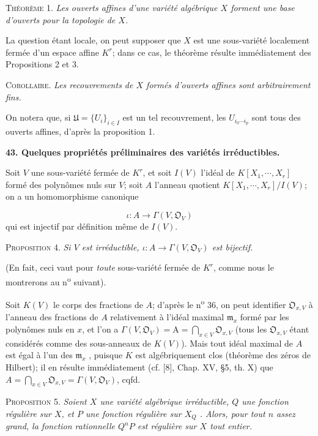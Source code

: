 \textsc{Théorème} 1. \textit{Les ouverts affines d'une variété algébrique $X$ forment une base d'ouverts pour la topologie de $X$.}

La question étant locale, on peut supposer que $X$ est une sous-variété localement fermée d'un espace affine $K^r$; dans ce cas, le théorème résulte immédiatement des Propositions 2 et 3.

\textsc{Corollaire}. \textit{Les recouvrements de $X$ formés d'ouverts affines sont arbitrairement fins.}

On notera que, si $\mathfrak{U} = \{U_i\}_{i \in I}$ est un tel recouvrement, les $U_{i_0 \cdots i_p}$ sont tous des ouverts affines, d'après la proposition 1.


\textbf{43. Quelques propriétés préliminaires des variétés irréductibles.}

Soit $V$ une
sous-variété fermée de $K^r$, et soit $I(V)$ l'idéal de $K[X_1 , \cdots , X_r]$ formé des polynômes nuls sur $V$; soit $A$ l'anneau quotient $K[X_1 , \cdots , X_r]/I(V)$; on a un homomorphisme canonique

\begin{equation*}
\iota : A \to \Gamma(V, \mathfrak{O}_V)
\end{equation*}
qui est injectif par définition même de $I(V)$.

\textsc{Proposition} 4. \textit{Si $V$ est irréductible, $\iota : A \to \Gamma(V, \mathfrak{O}_V)$ est bijectif.}

(En fait, ceci vaut pour \textit{toute} sous-variété fermée de $K^r$, comme nous le montrerons au n\textsuperscript{o} suivant).

Soit $K(V)$ le corps des fractions de $A$; d'après le n\textsuperscript{o} 36, on peut identifier $\mathfrak{O}_{x,V}$ à l'anneau des fractions de $A$ relativement à l'idéal maximal $\mathfrak{m}_x$ formé par les polynômes nuls en $x$, et l'on a $\Gamma(V, \mathfrak{O}_V) = \mathrm{A} = \bigcap_{x \in V} \mathfrak{O}_{x,V}$ (tous les $\mathfrak{O}_{x,V}$ étant considérés comme des sous-anneaux de $K(V)$). Mais tout idéal maximal de $A$ est égal à l'un des $\mathfrak{m}_x$ , puisque $K$ est algébriquement clos (théorème des zéros de Hilbert); il en résulte immédiatement (cf. [8], Chap. XV, §5, th. X) que $A = \bigcap_{x \in V} \mathfrak{O}_{x,V} = \Gamma(V, \mathfrak{O}_V)$, cqfd.

\textsc{Proposition} 5. \textit{Soient $X$ une variété algébrique irréductible, $Q$ une fonction régulière sur $X$, et $P$ une fonction régulière sur $X_Q$ . Alors, pour tout $n$ assez grand, la fonction rationnelle $Q^nP$ est régulière sur $X$ tout entier.}

